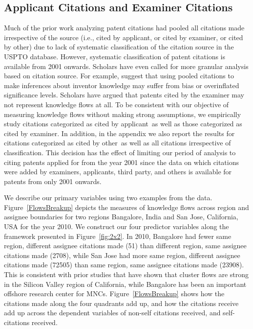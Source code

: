 \documentclass[12pt,letterpaper]{article}
\begin{document}
\subsection{Applicant Citations and Examiner Citations}
Much of the prior work analyzing patent citations had pooled all citations made irrespective of the source (i.e., cited by applicant, or cited by examiner, or cited by other) due to lack of systematic classification of the citation source in the USPTO database. However, systematic classification of patent citations is available from 2001 onwards. Scholars have even called for more granular analysis based on citation source. For example, \cite{Alcacer2006a} suggest that using pooled citations to make inferences about inventor knowledge may suffer from bias or overinflated significance levels. Scholars have argued that patents cited by the examiner may not represent knowledge flows at all. To be consistent with our objective of measuring knowledge flows without making strong assumptions, we empirically study citations categorized as \textquotesingle cited by applicant\textquotesingle \ as well as those categorized as \textquotesingle cited by examiner\textquotesingle. In addition, in the appendix we also report the results for citations categorized as \textquotesingle cited by other\textquotesingle \ as well as all citations irrespective of classification. This decision has the  effect of limiting our period of analysis to citing patents applied for from the year 2001 since the data on which citations were added by examiners, applicants, third party, and others is available for patents from only 2001 onwards. \par

We describe our primary variables using two examples from the data. Figure~\ref{FlowsBreakup} depicts  the measures of knowledge flows across region and assignee boundaries for two regions Bangalore, India and San Jose, California, USA for the year 2010. We construct our four predictor variables along the framework presented in Figure~\ref{fig:2x2}. In 2010, Bangalore had fewer same region, different assignee citations made (51) than different region, same assignee citations made (2708), while San Jose had more same region, different assignee citations made (72505) than same region, same assignee citations made (23908). This is consistent with prior studies that have shown that cluster flows are strong in the Silicon Valley region of California, while Bangalore has been an important offshore research center for MNCs. Figure~\ref{FlowsBreakup} shows how the citations made along the four quadrants add up, and how the citations receive add up across the dependent variables of non-self citations received, and self-citations received.
\end{document}
